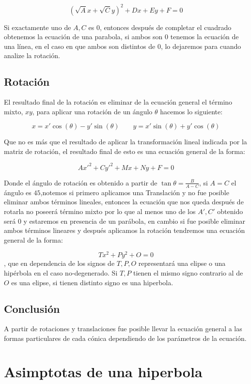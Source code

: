 \documentclass[14pt]{extarticle}
\begin{document}
$$(\sqrt{A}x + \sqrt{C}y)^2+Dx+Ey+F = 0$$

Si exactamente uno de $A,C$ es $0$, entonces después de completar el cuadrado obtenemos la ecuación de una parabola, si ambos son $0$ tenemos la ecuación de una línea, en el caso en que ambos son distintos de $0$, lo dejaremos para cuando analize la rotación.

\subsection{Rotación}

El resultado final de la rotación es eliminar de la ecuación general el término mixto, $xy$, para aplicar una rotación de un ángulo $\theta$ hacemos lo siguiente:

$$
x = x'\cos(\theta) - y'\sin(\theta)  \, \, \, \, \, \, \, \, \, \, \, \,  y = x'\sin(\theta)+y'\cos(\theta)
$$

Que no es más que el resultado de aplicar la transformación lineal indicada por la matriz de rotación, el resultado final de esto es una ecuación general de la forma:

$$Ax'^2+Cy'^2+Mx+Ny+F = 0$$

Donde el ángulo de rotación es obtenido a partir de $\tan \theta = \frac{B}{A-C}$, si $A = C$ el ángulo es $45$,notemos si primero aplicamos una Translación y no fue posible eliminar ambos términos lineales, entonces la ecuación que nos queda después de rotarla no poseerá término mixto por lo que al menos uno de los $A', C'$ obtenido será $0$ y estaremos en presencia de un parábola, en cambio si fue posible eliminar ambos términos lineares y después aplicamos la rotación tendremos una ecuación general de la forma:

$$Tx^2 + Py^2 + O = 0 $$, que en dependencia de los signos de $T,P,O$ representará una elipse  o  una hipérbola en el caso no-degenerado. Si $T,P$ tienen el mismo signo contrario al de $O$ es una elipse, si tienen distinto signo es una hiperbola.

\subsection{Conclusión}

A partir de rotaciones y translaciones fue posible llevar la ecuación general a las formas particulares de cada cónica dependiendo de los parámetros de la ecuación.

\section{Asimptotas de una hiperbola}
\end{document}
